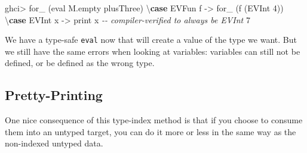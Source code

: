 \documentclass[]{article}
\newenvironment{Shaded}{}{}
\newcommand{\CommentTok}[1]{\textcolor[rgb]{0.38,0.63,0.69}{\textit{#1}}}
\newcommand{\DataTypeTok}[1]{\textcolor[rgb]{0.56,0.13,0.00}{#1}}
\newcommand{\DecValTok}[1]{\textcolor[rgb]{0.25,0.63,0.44}{#1}}
\newcommand{\FunctionTok}[1]{\textcolor[rgb]{0.02,0.16,0.49}{#1}}
\newcommand{\KeywordTok}[1]{\textcolor[rgb]{0.00,0.44,0.13}{\textbf{#1}}}
\newcommand{\NormalTok}[1]{#1}
\newcommand{\OperatorTok}[1]{\textcolor[rgb]{0.40,0.40,0.40}{#1}}
\newcommand{\OtherTok}[1]{\textcolor[rgb]{0.00,0.44,0.13}{#1}}
\begin{document}
\begin{Shaded}
\begin{Highlighting}[]
\NormalTok{ghci}\OperatorTok{\textgreater{}}\NormalTok{ for\_ (eval M.empty plusThree) \textbackslash{}}\KeywordTok{case}
    \DataTypeTok{EVFun}\NormalTok{ f }\OtherTok{{-}\textgreater{}}\NormalTok{ for\_ (f (}\DataTypeTok{EVInt} \DecValTok{4}\NormalTok{)) \textbackslash{}}\KeywordTok{case}
      \DataTypeTok{EVInt}\NormalTok{ x }\OtherTok{{-}\textgreater{}} \FunctionTok{print}\NormalTok{ x    }\CommentTok{{-}{-} compiler{-}verified to always be EVInt}
\DecValTok{7}
\end{Highlighting}
\end{Shaded}

We have a type-safe \texttt{eval} now that will create a value of the type we
want. But we still have the same errors when looking at variables: variables can
still not be defined, or be defined as the wrong type.

\subsection{Pretty-Printing}\label{pretty-printing}

One nice consequence of this type-index method is that if you choose to consume
them into an untyped target, you can do it more or less in the same way as the
non-indexed untyped data.
\end{document}
